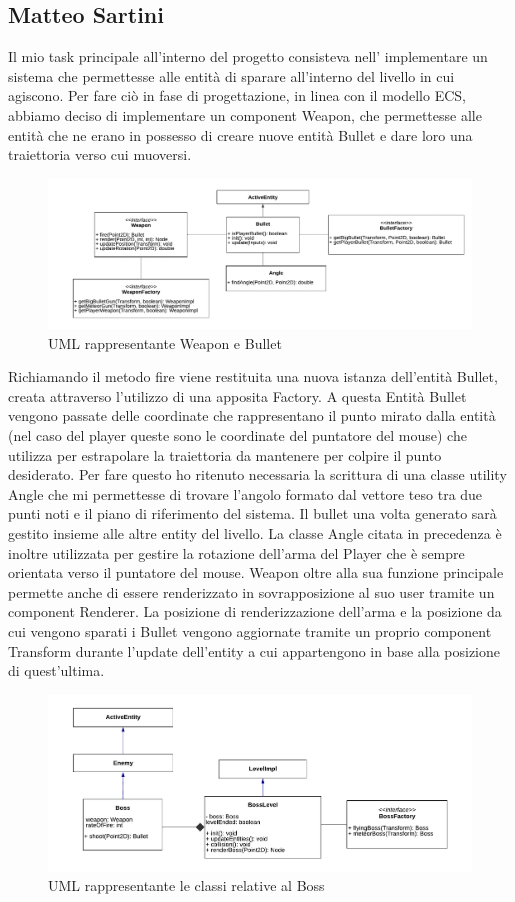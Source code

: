 \documentclass[a4paper,12pt]{report}
\begin{document}
\subsection{Matteo Sartini}
Il mio task principale all’interno del progetto consisteva nell’ implementare un sistema che permettesse alle entità di sparare all’interno del livello in cui agiscono.
Per fare ciò in fase di progettazione, in linea con il modello ECS, abbiamo deciso di implementare un component Weapon, che permettesse alle entità che ne erano in possesso di creare nuove entità Bullet e dare loro una traiettoria verso cui muoversi.
\begin{figure}[ht]
\centering
\includegraphics[width=1\textwidth]{UMLWeapon.png}
\caption{UML rappresentante Weapon e Bullet}
\label{fig:schgen}
\end{figure}
Richiamando il metodo fire viene restituita una nuova istanza dell’entità Bullet, creata attraverso l’utilizzo di una apposita Factory. A questa Entità Bullet vengono passate delle coordinate che rappresentano il punto mirato dalla entità (nel caso del player queste sono le coordinate del puntatore del mouse) che utilizza per estrapolare la traiettoria da mantenere per colpire il punto desiderato. Per fare questo ho ritenuto necessaria la scrittura di una classe utility Angle che mi permettesse di trovare l’angolo formato dal vettore teso tra due punti noti e il piano di riferimento del sistema. Il bullet una volta generato sarà gestito insieme alle altre entity del livello.
La classe Angle citata in precedenza è inoltre utilizzata per gestire la rotazione dell’arma del Player che è sempre orientata verso il puntatore del mouse.
Weapon oltre alla sua funzione principale permette anche di essere renderizzato in sovrapposizione al suo user tramite un component Renderer. La posizione di renderizzazione dell’arma e la posizione da cui vengono sparati i Bullet vengono aggiornate tramite un proprio component Transform durante l’update dell’entity a cui appartengono in base alla posizione di quest’ultima.
\begin{figure}[ht]
\centering
\includegraphics[width=1\textwidth]{UMLBoss.png}
\caption{UML rappresentante le classi relative al Boss}
\label{fig:schgen}
\end{figure}
\end{document}
